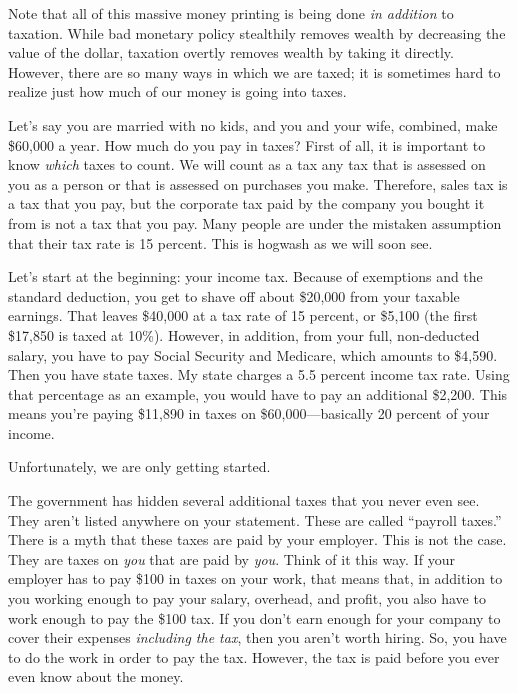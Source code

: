 Note that all of this massive money printing is being done \textit{in
addition }to taxation. While bad monetary policy stealthily removes
wealth by decreasing the value of the dollar, taxation overtly removes
wealth by taking it directly. However, there are so many ways in which
we are taxed; it is sometimes hard to realize just how much of our
money is going into taxes.

Let’s say you are married with no kids, and you and your wife, combined,
make \$60,000 a year. How much do you pay in taxes?  First of all, it
is important to know \textit{which} taxes to count. We will count as a
tax any tax that is assessed on you as a person or that is assessed on
purchases you make. Therefore, sales tax is a tax that you pay, but the
corporate tax paid by the company you bought it from is not a tax that
you pay. Many people are under the mistaken assumption that their tax
rate is 15 percent. This is hogwash as we will soon see.

Let’s start at the beginning: your income tax. Because of exemptions and
the standard deduction, you get to shave off about \$20,000 from your
taxable earnings.
That leaves \$40,000 at a tax rate of 15 percent, or \$5,100 (the first
\$17,850 is taxed at 10\%). However, in addition, from your full,
non-deducted salary, you have to pay Social Security and Medicare,
which amounts to \$4,590. Then you have state taxes. My state charges a
5.5 percent income tax
rate. Using that
percentage as an example, you would have to pay an additional \$2,200.
This means you’re
paying \$11,890 in taxes on \$60,000—basically 20 percent of
your income. 

Unfortunately, we are
only getting started.

The government has hidden several additional taxes that you never even
see. They aren’t listed anywhere on your statement. These are called
“payroll taxes.”  There is a myth that these taxes are paid by your
employer. This is not the case. They are taxes on \textit{you }that are
paid by\textit{ you}. Think of it this way. If your employer has to pay
\$100 in taxes on
your work, that means that, in addition to you working enough to pay
your salary, overhead, and profit, you also have to work enough to pay
the \$100 tax. If you don’t earn enough for your company to cover their
expenses \textit{including the tax}, then you aren’t worth hiring. So,
you have to do the work in order to pay the tax. However, the tax is
paid before you ever even know about the money.

